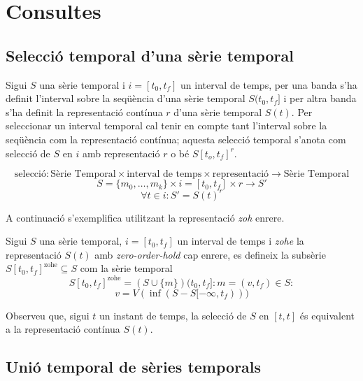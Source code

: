 {\section{Consultes}

\subsection{Selecció temporal d'una sèrie temporal}

Sigui $S$ una sèrie temporal i $i=[t_0,t_f]$ un interval de temps,
per una banda s'ha definit l'interval sobre la seqüència d'una sèrie temporal $S(t_0,t_f]$  i per altra banda s'ha definit la representació contínua $r$ d'una sèrie temporal $S(t)$. Per seleccionar un interval temporal cal tenir en compte tant l'interval sobre la seqüència com la representació contínua; aquesta selecció temporal s'anota com selecció de $S$ en $i$ amb representació $r$ o bé $S[t_o,t_f]^r$. 

\begin{definition}
  \[
  \text{selecció}: \text{Sèrie Temporal} \times \text{interval de
    temps} \times \text{representació} \longrightarrow \text{Sèrie
    Temporal}
  \]
  \[
  S = \{m_0 , \ldots , m_k\}  \times i = [t_0,t_f] \times r \longrightarrow S'
  \]
  \[
  \forall  t \in i: S' = S(t)^r 
  \] 
\end{definition}

A continuació s'exemplifica utilitzant la representació \emph{zoh} enrere.


\begin{definition}
  Sigui $S$ una sèrie temporal, $i=[t_0,t_f]$ un interval de temps i
  \emph{zohe} la representació $S(t)$ amb \emph{zero-order-hold} cap
  enrere, es defineix la subsèrie $S[t_0,t_f]^{\text{zohe}}\subseteq
  S$ com la sèrie temporal 
  \[
  S[t_0,t_f]^{\text{zohe}} = (S \cup \{m\})(t_0,t_f] : m=(v,t_f) \in S:
  \]
  \[
  v=  V(\inf(S-S[-\infty,t_f)))
  \]
\end{definition}

Observeu que, sigui $t$ un instant de temps, la selecció de $S$ en $[t,t]$ és equivalent a la representació contínua $S(t)$. 


\subsection{Unió temporal de sèries temporals}

}
